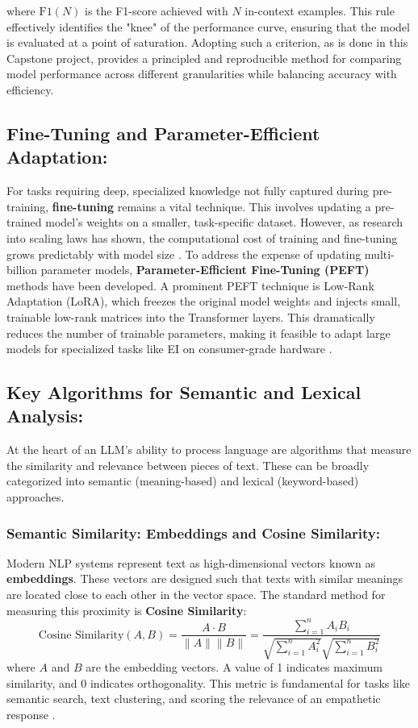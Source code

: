 where $\text{F1}(N)$ is the F1-score achieved with $N$ in-context examples. This rule effectively identifies the "knee" of the performance curve, ensuring that the model is evaluated at a point of saturation. Adopting such a criterion, as is done in this Capstone project, provides a principled and reproducible method for comparing model performance across different granularities while balancing accuracy with efficiency.

\subsection{Fine-Tuning and Parameter-Efficient Adaptation:} 
For tasks requiring deep, specialized knowledge not fully captured during pre-training, \textbf{fine-tuning} remains a vital technique. This involves updating a pre-trained model's weights on a smaller, task-specific dataset. However, as research into scaling laws has shown, the computational cost of training and fine-tuning grows predictably with model size \cite{kaplan2020scaling}. To address the expense of updating multi-billion parameter models, \textbf{Parameter-Efficient Fine-Tuning (PEFT)} methods have been developed. A prominent PEFT technique is Low-Rank Adaptation (LoRA), which freezes the original model weights and injects small, trainable low-rank matrices into the Transformer layers. This dramatically reduces the number of trainable parameters, making it feasible to adapt large models for specialized tasks like EI on consumer-grade hardware \cite{zhao2024moei}.

\subsection{Key Algorithms for Semantic and Lexical Analysis:} 
At the heart of an LLM's ability to process language are algorithms that measure the similarity and relevance between pieces of text. These can be broadly categorized into semantic (meaning-based) and lexical (keyword-based) approaches.

\subsubsection{Semantic Similarity: Embeddings and Cosine Similarity:} 
Modern NLP systems represent text as high-dimensional vectors known as \textbf{embeddings}. These vectors are designed such that texts with similar meanings are located close to each other in the vector space. The standard method for measuring this proximity is \textbf{Cosine Similarity}:
\begin{equation}
\text{Cosine Similarity}(A, B) = \frac{A \cdot B}{\|A\| \|B\|} = \frac{\sum_{i=1}^{n} A_i B_i}{\sqrt{\sum_{i=1}^{n} A_i^2} \sqrt{\sum_{i=1}^{n} B_i^2}}
\end{equation}
where $A$ and $B$ are the embedding vectors. A value of 1 indicates maximum similarity, and 0 indicates orthogonality. This metric is fundamental for tasks like semantic search, text clustering, and scoring the relevance of an empathetic response \cite{xie2024empathy}.

